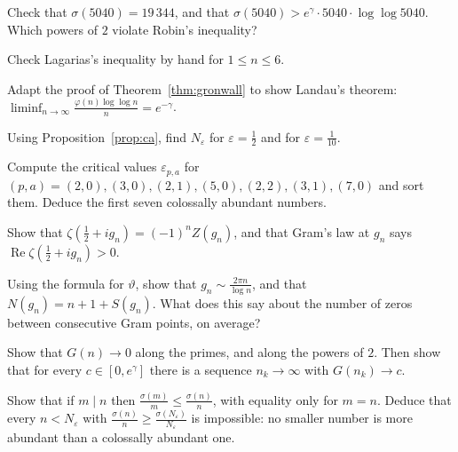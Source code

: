 \begin{exercise}[$\star$]\label{ex:robinfails}
Check that $\sigma(5040)=19\,344$, and that $\sigma(5040)>e^\gamma\cdot5040\cdot\log\log5040$. Which powers of $2$ violate Robin's inequality?
\end{exercise}

\begin{exercise}[$\star$]\label{ex:lagsmall}
Check Lagarias's inequality by hand for $1\le n\le6$.
\end{exercise}

\begin{exercise}[$\star\star$]\label{ex:landauphi}
Adapt the proof of Theorem~\ref{thm:gronwall} to show Landau's theorem: $\displaystyle\liminf_{n\to\infty}\frac{\varphi(n)\log\log n}n=e^{-\gamma}$.
\end{exercise}

\begin{exercise}[$\star$]\label{ex:cafirst}
Using Proposition~\ref{prop:ca}, find $N_\varepsilon$ for $\varepsilon=\frac12$ and for $\varepsilon=\frac1{10}$.
\end{exercise}

\begin{exercise}[$\star\star$]\label{ex:cacritical}
Compute the critical values $\varepsilon_{p,a}$ for $(p,a)=(2,0),(3,0),(2,1),(5,0),(2,2),(3,1),(7,0)$ and sort them. Deduce the first seven colossally abundant
numbers.
\end{exercise}

\begin{exercise}[$\star$]\label{ex:Zgram}
Show that $\zeta(\frac12+ig_n)=(-1)^nZ(g_n)$, and that Gram's law at $g_n$ says $\operatorname{Re}\zeta(\frac12+ig_n)>0$.
\end{exercise}

\begin{exercise}[$\star\star$]\label{ex:gramasym}
Using the formula for $\vartheta$, show that $g_n\sim\frac{2\pi n}{\log n}$, and that $N(g_n)=n+1+S(g_n)$. What does this say about the number of zeros between
consecutive Gram points, on average?
\end{exercise}

\begin{exercise}[$\star\star$]\label{ex:gronwallsub}
Show that $G(n)\to0$ along the primes, and along the powers of $2$. Then show that for every $c\in[0,e^\gamma]$ there is a sequence $n_k\to\infty$ with
$G(n_k)\to c$.
\end{exercise}

\begin{exercise}[$\star$]\label{ex:sigmamax}
Show that if $m\mid n$ then $\frac{\sigma(m)}m\le\frac{\sigma(n)}n$, with equality only for $m=n$. Deduce that every $n<N_\varepsilon$ with $\frac{\sigma(n)}n\ge\frac{\sigma(N_\varepsilon)}{N_\varepsilon}$ is
impossible: no smaller number is more abundant than a colossally abundant one.
\end{exercise}

